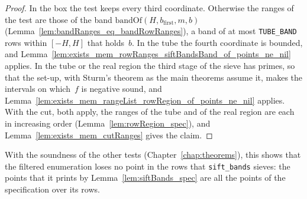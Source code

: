 \begin{proof}
  \leanok
  In the box the test keeps every third coordinate. Otherwise the ranges of the test are those of
  the band $\mathrm{bandOf}(H, b_{\mathrm{first}}, m, b)$
  (Lemma~\ref{lem:bandRanges_eq_bandRowRanges}), a band of at most \texttt{TUBE\_BAND} rows within
  $[-H, H]$ that holds~$b$. In the tube the fourth coordinate is bounded, and
  Lemma~\ref{lem:exists_mem_rowRanges_siftBandsBand_of_points_ne_nil} applies. In the tube or the
  real region the third stage of the sieve has primes, so that the set-up, with Sturm's theorem as
  the main theorems assume it, makes the intervals on which~$f$ is negative sound, and Lemma~\ref{lem:exists_mem_rangeList_rowRegion_of_points_ne_nil} applies. With the cut,
  both apply, the ranges of the tube and of the real region are each in increasing order
  (Lemma~\ref{lem:rowRegion_spec}), and Lemma~\ref{lem:exists_mem_cutRanges} gives the claim.
\end{proof}

With the soundness of the other tests (Chapter~\ref{chap:theorems}), this shows that the filtered
enumeration loses no point in the rows that \texttt{sift\_bands} sieves: the points that it prints
by Lemma~\ref{lem:siftBands_spec} are all the points of the specification over its rows.
